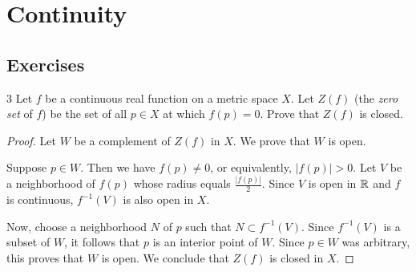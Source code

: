 \clearpage

\section{Continuity}
\subsection*{Exercises}

\begin{exercise}{3}
Let $f$ be a continuous real function on a metric space $X$.
Let $Z(f)$ (the \emph{zero set} of $f$) be the set of all $p \in X$ at which $f(p)=0$.
Prove that $Z(f)$ is closed.
\end{exercise}
\begin{proof}
Let $W$ be a complement of $Z(f)$ in $X$.
We prove that $W$ is open.

Suppose $p \in W$.
Then we have $f(p) \neq 0$, or equivalently, $|f(p)| >0$.
Let $V$ be a neighborhood of $f(p)$ whose radius equals $\frac{|f(p)|}{2}$.
Since $V$ is open in $\mathbb{R}$ and $f$ is continuous, $f^{-1}(V)$ is also open in $X$.

Now, choose a neighborhood $N$ of $p$ such that $N \subset f^{-1}(V)$.
Since $f^{-1}(V)$ is a subset of $W$, it follows that $p$ is an interior point of $W$.
Since $p \in W$ was arbitrary, this proves that $W$ is open.
We conclude that $Z(f)$ is closed in $X$.
\end{proof}

